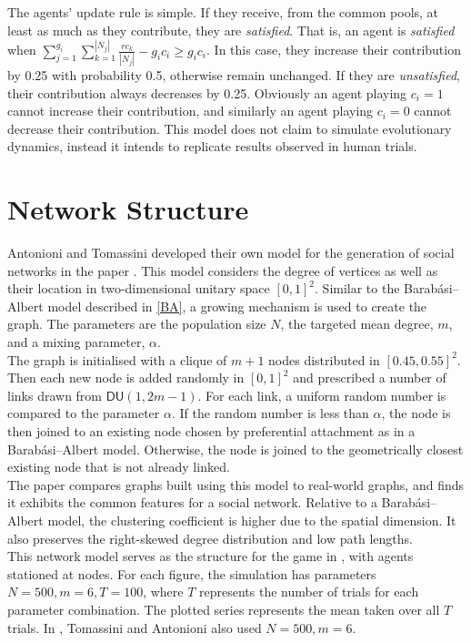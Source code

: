 The agents' update rule is simple. If they receive, from the common pools, at least as much as they contribute, they are \emph{satisfied}. That is, an agent is \emph{satisfied} when $\sum_{j=1}^{g_i} \sum_{k=1}^{|N_j|} \frac{rc_k}{|N_j|} - g_i c_i\geq g_i c_i$. In this case, they increase their contribution by 0.25 with probability 0.5, otherwise remain unchanged. If they are \emph{unsatisfied}, their contribution always decreases by 0.25. Obviously an agent playing $c_i =1$ cannot increase their contribution, and similarly an agent playing $c_i=0$ cannot decrease their contribution. This model does not claim to simulate evolutionary dynamics, instead it intends to replicate results observed in human trials. \\


\section{Network Structure}
Antonioni and Tomassini developed their own model for the generation of social networks in the paper \cite{RN51}. This model considers the degree of vertices as well as their location in two-dimensional unitary space $[0,1]^2$. Similar to the Barab\'{a}si--Albert model described in \ref{BA}, a growing mechanism is used to create the graph. The parameters are  the population size $N$, the targeted mean degree, $m$, and  a mixing parameter, $\alpha$. \\

The graph is initialised with a clique of $m+1$ nodes distributed in $[0.45, 0.55]^2$. Then each new node is added randomly in $[0,1]^2$ and prescribed a number of links drawn from $\mathsf{DU}(1,2m-1)$. For each link, a uniform random number is compared to the parameter $\alpha$. If the random number is less than $\alpha$, the node is then joined to an existing node chosen by preferential attachment as in a Barab\'{a}si--Albert model. Otherwise, the node is joined to the geometrically closest existing node that is not already linked. \\

The paper \cite{RN51} compares graphs built using this model to real-world graphs, and finds it exhibits the common features for a social network. Relative to a Barab\'{a}si--Albert model, the clustering coefficient is higher due to the spatial dimension. It also preserves the right-skewed degree distribution and low path lengths. \\

This network model serves as the structure for the game in \cite{RN49}, with agents stationed at nodes. For each figure, the simulation has parameters $N=500, m = 6, T=100$, where $T$ represents the number of trials for each parameter combination. The plotted series represents the mean taken over all $T$ trials. In \cite{RN49}, Tomassini and Antonioni also used $N=500, m = 6$. \\

